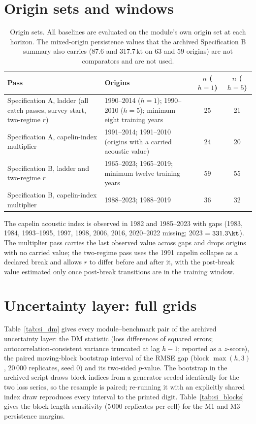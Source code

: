 \section{Origin sets and windows}\label{si:origins}

\begin{table}[!htb]
\centering\small
\caption{Origin sets. All baselines are evaluated on the module's own origin set at each horizon. The mixed-origin persistence values that the archived Specification B summary also carries (87.6 and 317.7\,kt on 63 and 59 origins) are not comparators and are not used.}
\begin{tabularx}{\textwidth}{@{}>{\raggedright\arraybackslash}p{}Lcc@{}}
\toprule
Pass & Origins & $n$ ($h=1$) & $n$ ($h=5$) \\
\midrule
Specification A, ladder (all catch passes, survey start, two-regime $r$) & 1990--2014 ($h=1$); 1990--2010 ($h=5$); minimum eight training years & 25 & 21 \\
Specification A, capelin-index multiplier & 1991--2014; 1991--2010 (origins with a carried acoustic value) & 24 & 20 \\
Specification B, ladder and two-regime $r$ & 1965--2023; 1965--2019; minimum twelve training years & 59 & 55 \\
Specification B, capelin-index multiplier & 1988--2023; 1988--2019 & 36 & 32 \\
\bottomrule
\end{tabularx}
\end{table}

The capelin acoustic index is observed in 1982 and 1985--2023 with gaps (1983, 1984, 1993--1995, 1997, 1998, 2006, 2016, 2020--2022 missing; 2023 $= 331.3\kt$). The multiplier pass carries the last observed value across gaps and drops origins with no carried value; the two-regime pass uses the 1991 capelin collapse as a declared break and allows $r$ to differ before and after it, with the post-break value estimated only once post-break transitions are in the training window.

\FloatBarrier
\section{Uncertainty layer: full grids}\label{si:uncertainty}

Table~\ref{tab:si_dm} gives every module--benchmark pair of the archived uncertainty layer: the DM statistic (loss differences of squared errors; autocorrelation-consistent variance truncated at lag $h-1$; reported as a $z$-score), the paired moving-block bootstrap interval of the RMSE gap (block $\max(h,3)$, 20\,000 replicates, seed 0) and its two-sided $p$-value. The bootstrap in the archived script draws block indices from a generator seeded identically for the two loss series, so the resample is paired; re-running it with an explicitly shared index draw reproduces every interval to the printed digit. Table~\ref{tab:si_blocks} gives the block-length sensitivity (5\,000 replicates per cell) for the M1 and M3 persistence margins.

